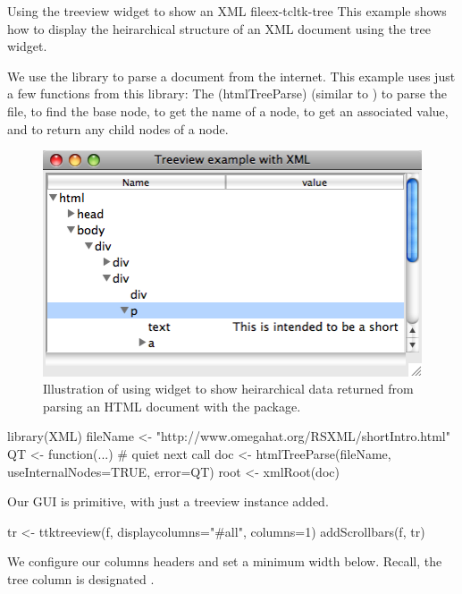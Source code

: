 \begin{example}{Using the treeview widget to show an XML file}{ex-tcltk-tree}
This example shows how to display the heirarchical structure of an XML
document using the tree widget.

We use the  library to parse a document from the
internet. This example uses just a few functions from this library:
The \function(htmlTreeParse) (similar to ) to parse the file, 
 to find the base node,
 to get the name of a node, 
 to get an associated value, and
 to return any child nodes of a node.



\begin{figure}
  \centering
  \includegraphics[width=.7\textwidth]{fig-tcltk-xml-viewer.png}
  \caption{Illustration of using  widget to show
    heirarchical data returned from parsing an HTML document with the
     package.}
  \label{fig:fig-tcltk-xml-viewer}
\end{figure}
\begin{Schunk}
\begin{Sinput}
 library(XML)
 fileName <- "http://www.omegahat.org/RSXML/shortIntro.html"
 QT <- function(...) {}  # quiet next call
 doc <- htmlTreeParse(fileName, useInternalNodes=TRUE, error=QT)
 root <- xmlRoot(doc)
\end{Sinput}
\end{Schunk}
Our GUI is primitive, with just a treeview instance added.
\begin{Schunk}
\begin{Sinput}
 tr <- ttktreeview(f, displaycolumns="#all", columns=1)
 addScrollbars(f, tr)                    
\end{Sinput}
\end{Schunk}

We configure our columns headers and set a minimum
width below. Recall, the tree column is designated .
\begin{Schunk}
\end{Schunk}


\end{example}
